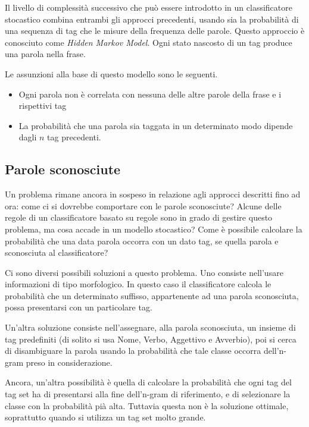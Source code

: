 Il livello di complessit\`a successivo che pu\`o essere introdotto in un
classificatore stocastico combina entrambi gli approcci precedenti, usando sia
la probabilit\`a di una sequenza di tag che le misure della frequenza delle parole.
Questo approccio \`e conosciuto come \emph{Hidden Markov Model}.
Ogni stato nascosto di un tag produce una parola nella frase.

Le assunzioni alla base di questo modello sono le seguenti.

\begin{itemize}
  \item Ogni parola non \`e correlata con nessuna delle altre parole della frase
        e i rispettivi tag
  \item La probabilit\`a che una parola sia taggata in un determinato modo dipende
        dagli $n$ tag precedenti.
\end{itemize}

\subsection{Parole sconosciute}

Un problema rimane ancora in sospeso in relazione agli approcci descritti fino
ad ora: come ci si dovrebbe comportare con le parole sconosciute? Alcune delle
regole di un classificatore basato su regole sono in grado di gestire questo
problema, ma cosa accade in un modello stocastico? Come \`e possibile calcolare
la probabilit\`a che una data parola occorra con un dato tag, se quella parola e
sconosciuta al classificatore?

Ci sono diversi possibili soluzioni a questo problema.
Uno consiste nell'usare informazioni di tipo morfologico.
In questo caso il classificatore calcola le probabilit\`a che un determinato
suffisso, appartenente ad una parola sconosciuta, possa presentarsi con un
particolare tag.

Un'altra soluzione consiste nell'assegnare, alla parola sconosciuta, un insieme
di tag predefiniti (di solito si usa Nome, Verbo, Aggettivo e Avverbio), poi si
cerca di disambiguare la parola usando la probabilit\`a che tale classe occorra
dell'n-gram preso in considerazione.

Ancora, un'altra possibilit\`a \`e quella di calcolare la probabilit\`a che ogni
tag del tag set ha di presentarsi alla fine dell'n-gram di riferimento, e di
selezionare la classe con la probabilit\`a pi\`a alta. Tuttavia questa non \`e
la soluzione ottimale, soprattutto quando si utilizza un tag set molto grande.

